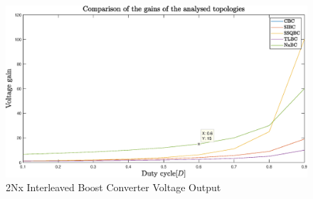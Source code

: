 \begin{figure}[H]
   \centering
   \includegraphics[width=\textwidth]{figures/gains.eps}
    \caption{2Nx Interleaved Boost Converter Voltage Output}
	\label{fig:MBC_2NxSimResult}
\end{figure}